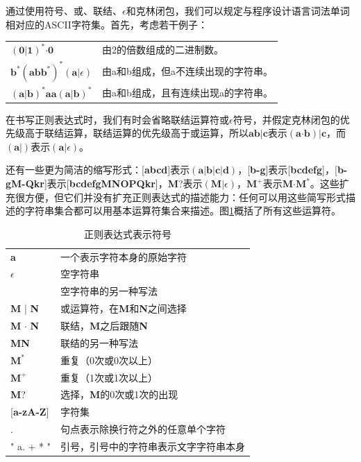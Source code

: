 \documentclass[cn,11pt,chinese]{elegantbook}
\begin{document}
通过使用符号、或、联结、$\epsilon$和克林闭包，我们可以规定与程序设计语言词法单词相对应的ASCII字符集。首先，考虑若干例子：

\begin{center}
  \begin{tabular}{ll}
    $(\textbf{0}|\textbf{1})^*\boldsymbol{\cdot}\textbf{0}$ & 由2的倍数组成的二进制数。\\
    $\textbf{b}^*(\textbf{abb}^*)^*(\textbf{a}|\epsilon)$ & 由a和b组成，但a不连续出现的字符串。\\
    $(\textbf{a}|\textbf{b})^*\textbf{aa}(\textbf{a}|\textbf{b})^*$ & 由a和b组成，且有连续出现a的字符串。\\
  \end{tabular}
\end{center}

在书写正则表达式时，我们有时会省略联结运算符或$\epsilon$符号，并假定克林闭包的优先级高于联结运算，联结运算的优先级高于或运算，所以$\textbf{ab}|\textbf{c}$表示$(\textbf{a}\boldsymbol{\cdot}\textbf{b})|\textbf{c}$，而$(\textbf{a}|)$表示$(\textbf{a}|\epsilon)$。

还有一些更为简洁的缩写形式：[\textbf{abcd}]表示$(\textbf{a}|\textbf{b}|\textbf{c}|\textbf{d})$，[\textbf{b-g}]表示[\textbf{bcdefg}]，[\textbf{b-gM-Qkr}]表示[\textbf{bcdefgMNOPQkr}]，\textbf{M}?表示$(\textbf{M}|\epsilon)$，$\textbf{M}^+$表示$\textbf{M}\boldsymbol{\cdot}\textbf{M}^*$。这些扩充很方便，但它们并没有扩充正则表达式的描述能力：任何可以用这些简写形式描述的字符串集合都可以用基本运算符集合来描述。图\ref{fig:2-1}概括了所有这些运算符。

\renewcommand\tablename{图}
\begin{table}[htbp]
  \centering
  \begin{tabular}{ll}
    \toprule
    \textbf{a} & 一个表示字符本身的原始字符 \\
    $\epsilon$ & 空字符串 \\
               & 空字符串的另一种写法 \\
    \textbf{M} | \textbf{N} & 或运算符，在\textbf{M}和\textbf{N}之间选择 \\
    \textbf{M} $\boldsymbol{\cdot}$ \textbf{N} & 联结，\textbf{M}之后跟随\textbf{N} \\
    \textbf{MN} & 联结的另一种写法 \\
    $\textbf{M}^*$ & 重复（0次或0次以上） \\
    $\textbf{M}^+$ & 重复（1次或1次以上） \\
    \textbf{M}? & 选择，\textbf{M}的0次或1次的出现 \\
    {[}\textbf{a-zA-Z}{]} & 字符集 \\
    . & 句点表示除换行符之外的任意单个字符 \\
    " a. + * " & 引号，引号中的字符串表示文字字符串本身 \\
    \bottomrule
  \end{tabular}
  \caption{正则表达式表示符号}
  \label{fig:2-1}
\end{table}
\renewcommand\tablename{表}
\end{document}
